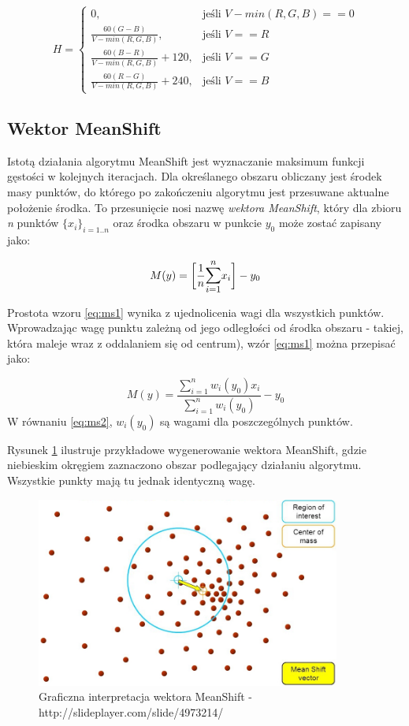 \begin{equation}
\label{HSV_last}
H=\begin{cases}
	0, & \text{jeśli } V-min(R,G,B)==0 \\
	\frac{60(G-B)}{V-min(R,G,B)}, & \text{jeśli } V==R \\
	\frac{60(B-R)}{V-min(R,G,B)}+120, & \text{jeśli } V==G \\
	\frac{60(R-G)}{V-min(R,G,B)}+240, & \text{jeśli } V==B 
\end{cases}
\end{equation}

\subsection{Wektor MeanShift}
\label{ssec:MS}
Istotą działania algorytmu MeanShift jest wyznaczanie maksimum funkcji gęstości w kolejnych iteracjach. Dla określanego obszaru obliczany jest środek masy punktów, do którego po zakończeniu algorytmu jest przesuwane aktualne położenie środka. To przesunięcie nosi nazwę \textit{wektora MeanShift}, który dla zbioru \textit{n} punktów $\{x_{i}\}_{i=1..n}$ oraz środka obszaru w punkcie $y_0$ może zostać zapisany jako:

\begin{equation}
\label{eq:ms1}
M(y)=\bigg[\frac{1}{n}\mathlarger{\sum\limits_{i=1}^{n}}x_i\bigg]-y_0
\end{equation}

Prostota wzoru \ref{eq:ms1} wynika z ujednolicenia wagi dla wszystkich punktów. Wprowadzając wagę punktu zależną od jego odległości od środka obszaru - takiej, która maleje wraz z oddalaniem się od centrum), wzór \ref{eq:ms1} można przepisać jako:

\begin{equation}
\label{eq:ms2}
M(y)=\frac{\sum_{i=1}^{n}w_i(y_0)x_i}{\sum_{i=1}^{n}w_i(y_0)}-y_0
\end{equation}
W równaniu \ref{eq:ms2}, $w_i(y_0)$ są wagami dla poszczególnych punktów.

Rysunek  \ref{fig:ms_vector} ilustruje przykładowe wygenerowanie wektora MeanShift, gdzie niebieskim okręgiem zaznaczono obszar podlegający działaniu algorytmu. Wszystkie punkty mają tu jednak identyczną wagę.
\begin{figure}[h]
	\centering
	\includegraphics[width=10cm]{3_meanshift.jpg}
	\caption{Graficzna interpretacja wektora MeanShift - http://slideplayer.com/slide/4973214/}
	\label{fig:ms_vector}
\end{figure}

